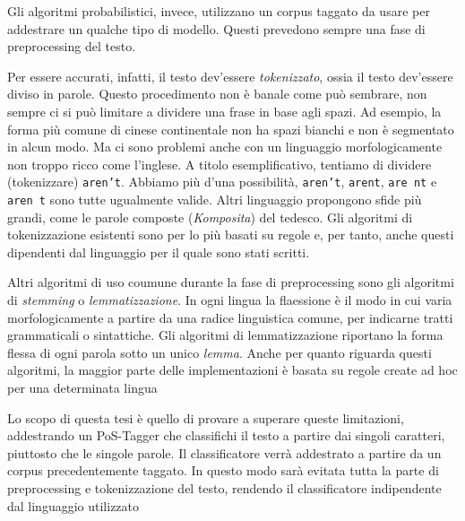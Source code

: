 Gli algoritmi probabilistici, invece, utilizzano un corpus taggato da usare per addestrare un qualche tipo di modello.
Questi prevedono sempre una fase di preprocessing del testo.

Per essere accurati, infatti, il testo dev'essere \emph{tokenizzato}, ossia il testo dev'essere diviso in parole.
Questo procedimento non \`e banale come pu\`o sembrare, non sempre ci si pu\`o limitare a dividere una frase in base agli spazi.
Ad esempio, la forma pi\`u comune di cinese continentale non ha spazi bianchi e non \`e segmentato in alcun modo.
Ma ci sono problemi anche con un linguaggio morfologicamente non troppo ricco come l'inglese.
A titolo esemplificativo, tentiamo di dividere (tokenizzare) \texttt{aren't}.
Abbiamo pi\`u d'una possibilit\`a, \texttt{aren't}, \texttt{arent}, \texttt{are nt} e \texttt{aren t} sono tutte ugualmente valide.
Altri linguaggio propongono sfide pi\`u grandi, come le parole composte (\emph{Komposita}) del tedesco.
Gli algoritmi di tokenizzazione esistenti sono per lo pi\`u basati su regole e, per tanto, anche questi dipendenti dal linguaggio per il quale sono stati scritti.

Altri algoritmi di uso coumune durante la fase di preprocessing sono gli algoritmi di \emph{stemming} o \emph{lemmatizzazione}.
In ogni lingua la flaessione \`e il modo in cui varia morfologicamente a partire da una radice linguistica comune, per indicarne tratti grammaticali o sintattiche.
Gli algoritmi di lemmatizzazione riportano la forma flessa di ogni parola sotto un unico \emph{lemma}.
Anche per quanto riguarda questi algoritmi, la maggior parte delle implementazioni \`e basata su regole create ad hoc per una determinata lingua

Lo scopo di questa tesi \`e quello di provare a superare queste limitazioni, addestrando un PoS-Tagger che classifichi il testo a partire dai singoli caratteri, piuttosto che le singole parole.
Il classificatore verr\`a addestrato a partire da un corpus precedentemente taggato.
In questo modo sar\`a evitata tutta la parte di preprocessing e tokenizzazione del testo, rendendo il classificatore indipendente dal linguaggio utilizzato
